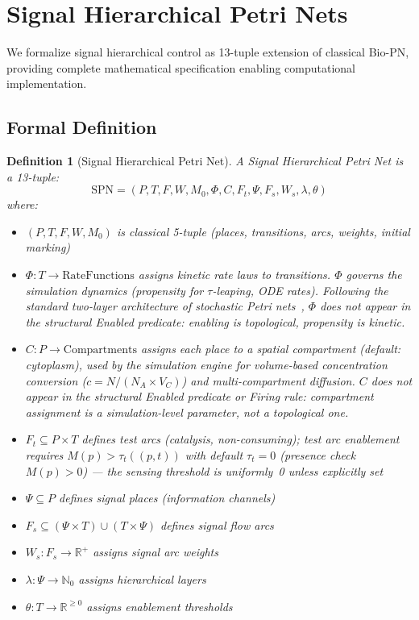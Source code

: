 \documentclass[10pt,letterpaper]{article}
\newtheorem{definition}{Definition}
\begin{document}
\FloatBarrier
\section{Signal Hierarchical Petri Nets}

We formalize signal hierarchical control as 13-tuple extension of classical Bio-PN, providing complete mathematical specification enabling computational implementation.

\subsection{Formal Definition}

\begin{definition}[Signal Hierarchical Petri Net]
A Signal Hierarchical Petri Net is a 13-tuple:
\begin{equation}
\text{SPN} = (P, T, F, W, M_0, \Phi, C, F_t, \Psi, F_s, W_s, \lambda, \theta)
\end{equation}
where:
\begin{itemize}
\item $(P, T, F, W, M_0)$ is classical 5-tuple (places, transitions, arcs, weights, initial marking)
\item $\Phi: T \rightarrow \text{RateFunctions}$ assigns kinetic rate laws to transitions.
  $\Phi$ governs the simulation dynamics (propensity for $\tau$-leaping, ODE rates).
  Following the standard two-layer architecture of stochastic Petri nets~\cite{goss1998},
  $\Phi$ does not appear in the structural Enabled predicate: enabling is topological,
  propensity is kinetic.
\item $C: P \rightarrow \text{Compartments}$ assigns each place to a spatial
  compartment (default: cytoplasm), used by the simulation engine for
  volume-based concentration conversion ($c = N / (N_A \times V_C)$) and
  multi-compartment diffusion.
  $C$ does not appear in the structural Enabled predicate or Firing rule:
  compartment assignment is a simulation-level parameter, not a topological one.
\item $F_t \subseteq P \times T$ defines test arcs (catalysis, non-consuming); test arc
  enablement requires $M(p) > \tau_t((p,t))$ with default $\tau_t = 0$ (presence
  check $M(p) > 0$) --- the sensing threshold is uniformly~0 unless explicitly set
\item $\Psi \subseteq P$ defines signal places (information channels)
\item $F_s \subseteq (\Psi \times T) \cup (T \times \Psi)$ defines signal flow arcs
\item $W_s: F_s \rightarrow \mathbb{R}^+$ assigns signal arc weights
\item $\lambda: \Psi \rightarrow \mathbb{N}_0$ assigns hierarchical layers
\item $\theta: T \rightarrow \mathbb{R}^{\geq 0}$ assigns enablement thresholds
\end{itemize}
\end{definition}
\end{document}
